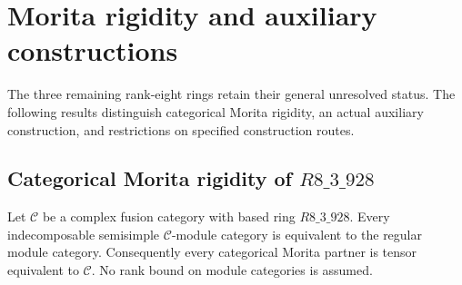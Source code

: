 \section{Morita rigidity and auxiliary constructions}
\label{sec:m3-theoretical-retry}

The three remaining rank-eight rings retain their general unresolved status.
The following results distinguish categorical Morita rigidity, an actual
auxiliary construction, and restrictions on specified construction routes.

\subsection{Categorical Morita rigidity of $R8\_3\_928$}
\begin{theorem}
Let $\mathcal C$ be a complex fusion category with based ring
$R8\_3\_928$. Every indecomposable semisimple $\mathcal C$-module
category is equivalent to the regular module category. Consequently
every categorical Morita partner is tensor equivalent to $\mathcal C$.
No rank bound on module categories is assumed.
\end{theorem}
